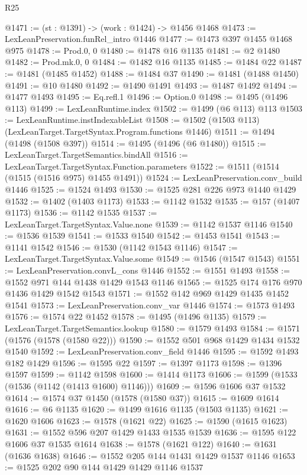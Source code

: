 \begin{lexlean}{R25}
\begin{coremodule}
@1471 := (st : @1391) -> (work : @1424) -> @1456 @1468
@1473 := LexLeanPreservation.funRel_intro @1446
@1477 := @1473 @397 @1455 @1468 @975
@1478 := Prod.{0, 0}
@1480 := @1478 @16 @1135
@1481 := @2 @1480
@1482 := Prod.mk.{0, 0}
@1484 := @1482 @16 @1135
@1485 := @1484 @22
@1487 := @1481 (@1485 @1452)
@1488 := @1484 @37
@1490 := @1481 (@1488 @1450)
@1491 := @10 @1480
@1492 := @1490 @1491
@1493 := @1487 @1492
@1494 := @1477 @1493
@1495 := Eq.refl.{1}
@1496 := Option.{0}
@1498 := @1495 (@1496 @113)
@1499 := LexLeanRuntime.index
@1502 := @1499 (@6 @113) @113
@1503 := LexLeanRuntime.instIndexableList
@1508 := @1502 (@1503 @113) (LexLeanTarget.TargetSyntax.Program.functions @1446)
@1511 := @1494 (@1498 (@1508 @397))
@1514 := @1495 (@1496 (@6 @1480))
@1515 := LexLeanTarget.TargetSemantics.bindAll
@1516 := LexLeanTarget.TargetSyntax.Function.parameters
@1522 := @1511 (@1514 (@1515 (@1516 @975) @1455 @1491))
@1524 := LexLeanPreservation.conv_build @1446
@1525 := @1524 @1493
@1530 := @1525 @281 @226 @973 @1440 @1429
@1532 := @1402 (@1403 @1173)
@1533 := @1142 @1532
@1535 := @157 (@1407 @1173)
@1536 := @1142 @1535
@1537 := LexLeanTarget.TargetSyntax.Value.none
@1539 := @1142 @1537 @1146
@1540 := @1536 @1539
@1541 := @1533 @1540
@1542 := @1453 @1541
@1543 := @1141 @1542
@1546 := @1530 (@1142 @1543 @1146)
@1547 := LexLeanTarget.TargetSyntax.Value.some
@1549 := @1546 (@1547 @1543)
@1551 := LexLeanPreservation.convL_cons @1446
@1552 := @1551 @1493
@1558 := @1552 @971 @144 @1438 @1429 @1543 @1146
@1565 := @1525 @174 @176 @970 @1436 @1429 @1542 @1543
@1571 := @1552 @142 @969 @1429 @1435 @1452 @1541
@1573 := LexLeanPreservation.conv_var @1446
@1574 := @1573 @1493
@1576 := @1574 @22 @1452
@1578 := @1495 (@1496 @1135)
@1579 := LexLeanTarget.TargetSemantics.lookup
@1580 := @1579 @1493
@1584 := @1571 (@1576 (@1578 (@1580 @22)))
@1590 := @1552 @501 @968 @1429 @1434 @1532 @1540
@1592 := LexLeanPreservation.conv_field @1446
@1595 := @1592 @1493 @182 @1429
@1596 := @1595 @22
@1597 := @1397 @1173
@1598 := @1396 @1597
@1599 := @1142 @1598
@1600 := @1414 @1173
@1606 := @1599 (@1533 (@1536 (@1142 (@1413 @1600) @1146)))
@1609 := @1596 @1606 @37 @1532
@1614 := @1574 @37 @1450 (@1578 (@1580 @37))
@1615 := @1609 @1614
@1616 := @6 @1135
@1620 := @1499 @1616 @1135 (@1503 @1135)
@1621 := @1620 @1606
@1623 := @1578 (@1621 @22)
@1625 := @1590 (@1615 @1623)
@1631 := @1552 @596 @207 @1429 @1433 @1535 @1539
@1636 := @1595 @122 @1606 @37 @1535 @1614
@1638 := @1578 (@1621 @122)
@1640 := @1631 (@1636 @1638)
@1646 := @1552 @205 @144 @1431 @1429 @1537 @1146
@1653 := @1525 @202 @90 @144 @1429 @1429 @1146 @1537

\end{coremodule}
\end{lexlean}
